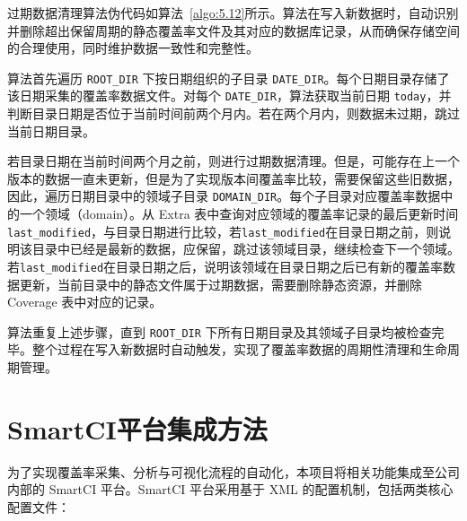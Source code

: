 过期数据清理算法伪代码如算法~\ref{algo:5.12}所示。算法在写入新数据时，自动识别并删除超出保留周期的静态覆盖率文件及其对应的数据库记录，从而确保存储空间的合理使用，同时维护数据一致性和完整性。

\begin{algorithm}[ht]
\caption{数据存储-过期数据清理算法}
\label{algo:5.12}

\end{algorithm}

算法首先遍历 \verb|ROOT_DIR| 下按日期组织的子目录 \verb|DATE_DIR|。每个日期目录存储了该日期采集的覆盖率数据文件。对每个 \verb|DATE_DIR|，算法获取当前日期 \verb|today|，并判断目录日期是否位于当前时间前两个月内。若在两个月内，则数据未过期，跳过当前日期目录。

若目录日期在当前时间两个月之前，则进行过期数据清理。但是，可能存在上一个版本的数据一直未更新，但是为了实现版本间覆盖率比较，需要保留这些旧数据，因此，遍历日期目录中的领域子目录 \verb|DOMAIN_DIR|。每个子目录对应覆盖率数据中的一个领域（domain）。从 Extra 表中查询对应领域的覆盖率记录的最后更新时间 \verb|last_modified|，与目录日期进行比较，若\verb|last_modified|在目录日期之前，则说明该目录中已经是最新的数据，应保留，跳过该领域目录，继续检查下一个领域。若\verb|last_modified|在目录日期之后，说明该领域在目录日期之后已有新的覆盖率数据更新，当前目录中的静态文件属于过期数据，需要删除静态资源，并删除 Coverage 表中对应的记录。

算法重复上述步骤，直到 \verb|ROOT_DIR| 下所有日期目录及其领域子目录均被检查完毕。整个过程在写入新数据时自动触发，实现了覆盖率数据的周期性清理和生命周期管理。


\section{SmartCI平台集成方法}
为了实现覆盖率采集、分析与可视化流程的自动化，本项目将相关功能集成至公司内部的 SmartCI 平台。SmartCI 平台采用基于 XML 的配置机制，包括两类核心配置文件：

